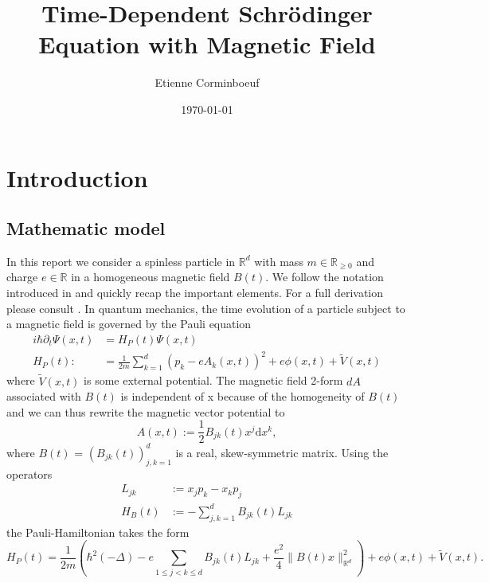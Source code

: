\documentclass{article}
\title{Time-Dependent Schr{\"o}dinger Equation with Magnetic Field}
\author{Etienne Corminboeuf}
\date{\today}
\begin{document}
\maketitle

\tableofcontents

\section{Introduction}

\subsection{Mathematic model}

In this report we consider a spinless particle in $\mathbb{R}^d$ with mass $m \in \mathbb{R}_{\geq 0}$ and charge $e\in \mathbb{R}$ in a homogeneous magnetic field $B(t)$. We follow the notation introduced in \cite{paper_orvg} and quickly recap the important elements. For a full derivation please consult \cite{paper_orvg}.
In quantum mechanics, the time evolution of a particle subject to a magnetic field is governed by the Pauli equation
\begin{align} \label{eq_pauli}
  i \hbar \partial_t \Psi(x,t) &= H_P(t)\Psi(x,t) \\
  H_P(t) :&= \frac{1}{2m} \sum_{k=1}^d (p_k - e A_k(x,t))^2 + e\phi(x,t) + \tilde{V}(x,t)
\end{align}
where $\tilde{V}(x,t)$ is some external potential.
The magnetic field 2-form $dA$ associated with $B(t)$ is independent of x because of the homogeneity of $B(t)$ and we can thus rewrite the magnetic vector potential to
\begin{equation}
  A(x,t) := \frac{1}{2}B_{jk}(t)x^j \textrm{d}x^k,
\end{equation}
where $B(t)$ = $(B_{jk}(t))_{j,k = 1}^d$ is a real, skew-symmetric matrix. Using the operators
\begin{align}
  L_{jk} & := x_j p_k - x_k p_j \\
  H_B(t) & := - \sum_{j,k = 1}^d B_{jk}(t) L_{jk}
\end{align}
the Pauli-Hamiltonian takes the form
\begin{equation}
  H_P(t) = \frac{1}{2 m} \left(\hbar^{2}(-\Delta)-e \sum_{1 \leqslant j<k \leqslant d} B_{j k}(t) L_{j k} +\frac{e^{2}}{4}\|B(t) x\|_{\mathbb{R}^{d}}^{2}  \right) + e \phi(x,t) + \tilde{V}(x,t).
\end{equation}
\end{document}
